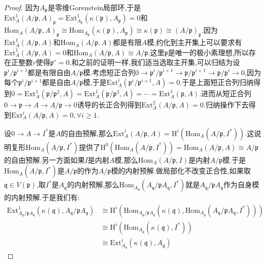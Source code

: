 \begin{enumerate}
\begin{proof}
    	因为$A_{\mathfrak{p}}$是零维Gorenstein局部环,于是$\mathrm{Ext}_A^1(A/\mathfrak{p},A)_{\mathfrak{p}}=\mathrm{Ext}_{A_{\mathfrak{p}}}^1(\kappa(\mathfrak{p}),A_{\mathfrak{p}})=0$和$\mathrm{Hom}_A(A/\mathfrak{p},A)_{\mathfrak{p}}\cong\mathrm{Hom}_{A_{\mathfrak{p}}}(\kappa(\mathfrak{p}),A_{\mathfrak{p}})\cong\kappa(\mathfrak{p})\cong(A/\mathfrak{p})_{\mathfrak{p}}$.因为$\mathrm{Ext}_A^1(A/\mathfrak{p},A)$和$\mathrm{Hom}_A(A/\mathfrak{p},A)$都是有限$A$模,约化到主开集上可以要求有$\mathrm{Ext}_A^1(A/\mathfrak{p},A)=0$和$\mathrm{Hom}_A(A/\mathfrak{p},A)\cong A/\mathfrak{p}$.这里$\mathfrak{p}$是唯一的极小素理想,所以存在正整数$r$使得$\mathfrak{p}^r=0$.和之前的证明一样,我们适当选取主开集,可以归结为设$\mathfrak{p}^i/\mathfrak{p}^{i+1}$都是有限自由$A/\mathfrak{p}$模.考虑短正合列$0\to\mathfrak{p}^i/\mathfrak{p}^{i+1}\to\mathfrak{p}/\mathfrak{p}^{i+1}\to\mathfrak{p}/\mathfrak{p}^i\to0$,因为每个$\mathfrak{p}^i/\mathfrak{p}^{i+1}$都是自由$A/\mathfrak{p}$模,于是$\mathrm{Ext}_A^i(\mathfrak{p}^i/\mathfrak{p}^{i+1},A)=0$.于是上面短正合列归纳得到$0=\mathrm{Ext}_A^1(\mathfrak{p}/\mathfrak{p}^2,A)=\mathrm{Ext}_A^1(\mathfrak{p}/\mathfrak{p}^3,A)=\cdots=\mathrm{Ext}_A^1(\mathfrak{p},A)$.进而从短正合列$0\to\mathfrak{p}\to A\to A/\mathfrak{p}\to0$诱导的长正合列得到$\mathrm{Ext}_A^2(A/\mathfrak{p},A)=0$.归纳操作下去得到$\mathrm{Ext}_A^i(A/\mathfrak{p},A)=0,\forall i\ge1$.
    	
    	\qquad
    	
    	设$0\to A\to I^*$是$A$的自由预解,那么$\mathrm{Ext}_A^i(A/\mathfrak{p},A)=\mathrm{H}^i(\mathrm{Hom}_A(A/\mathfrak{p},I^*))$.这说明复形$\mathrm{Hom}_A(A/\mathfrak{p},I^*)$提供了$\mathrm{H}^0(\mathrm{Hom}_A(A/\mathfrak{p},I^*))=\mathrm{Hom}_A(A/\mathfrak{p},A)\cong A/\mathfrak{p}$的自由预解.另一方面如果$I$是内射$A$模,那么$\mathrm{Hom}_A(A/\mathfrak{p},I)$是内射$A/\mathfrak{p}$模.于是$\mathrm{Hom}_A(A/\mathfrak{p},I^*)$是$A/\mathfrak{p}$的作为$A/\mathfrak{p}$模的内射预解.做局部化不改变正合性,如果取$\mathfrak{q}\in V(\mathfrak{p})$,取$I^*$是$A_{\mathfrak{q}}$的内射预解,那么$\mathrm{Hom}_{A_{\mathfrak{q}}}(A_{\mathfrak{q}}/\mathfrak{p}A_{\mathfrak{q}},I^*)$就是$A_{\mathfrak{q}}/\mathfrak{p}A_{\mathfrak{q}}$作为自身模的内射预解.于是我们有:
    	\begin{align*}
    		\mathrm{Ext}_{A_{\mathfrak{q}}/\mathfrak{p}A_{\mathfrak{q}}}^1(\kappa(\mathfrak{q}),A_{\mathfrak{q}}/\mathfrak{p}A_{\mathfrak{q}})&\cong\mathrm{H}^i\left(\mathrm{Hom}_{A_{\mathfrak{q}}/\mathfrak{p}A_{\mathfrak{q}}}(\kappa(\mathfrak{q}),\mathrm{Hom}_{A_{\mathfrak{q}}}(A_{\mathfrak{q}}/\mathfrak{p}A_{\mathfrak{q}},I^*))\right)\\&\cong\mathrm{H}^i\left(\mathrm{Hom}_{A_{\mathfrak{q}}}(\kappa(\mathfrak{q}),I^*)\right)\\&\cong\mathrm{Ext}_{A_{\mathfrak{q}}}^i(\kappa(\mathfrak{q}),A_{\mathfrak{q}})
    	\end{align*}
    	

\end{proof}
\end{enumerate}
